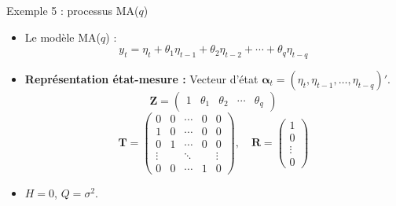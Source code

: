 \documentclass[11pt,aspectratio=169]{beamer}
\begin{document}
\begin{frame}{Exemple 5 : processus MA($q$)}

\begin{itemize}

\item Le modèle MA($q$) :
  \[
  y_t = \eta_t + \theta_1 \eta_{t-1} + \theta_2 \eta_{t-2} + \cdots + \theta_q \eta_{t-q}
  \]\newline

\item \textbf{Représentation état-mesure :} Vecteur d'état $\bm{\alpha}_t = (\eta_t, \eta_{t-1}, \ldots, \eta_{t-q})'$.
  \[
  \bm{Z} = \begin{pmatrix} 1 & \theta_1 & \theta_2 & \cdots & \theta_q \end{pmatrix}
  \]
  \[
  \bm{T} = \begin{pmatrix}
      0 & 0 & \cdots & 0 & 0 \\
      1 & 0 & \cdots & 0 & 0 \\
      0 & 1 & \cdots & 0 & 0 \\
      \vdots & & \ddots & & \vdots \\
      0 & 0 & \cdots & 1 & 0
  \end{pmatrix}, \quad
  \bm{R} = \begin{pmatrix} 1 \\ 0 \\ \vdots \\ 0 \end{pmatrix}
  \]\newline

\item $H = 0$, $Q = \sigma^2$.

\end{itemize}

\end{frame}
\end{document}
